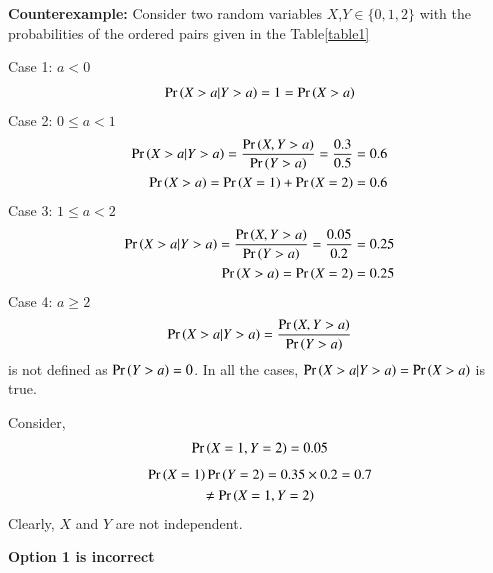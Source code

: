 \documentclass[journal,12pt,twocolumn]{IEEEtran}
\begin{document}
\begin{enumerate}
    \textbf{Counterexample:} Consider two random variables $X$,$Y \in \{0,1,2\}$ with the probabilities of the ordered pairs  given in the Table\ref{table1}
    \begin{center}
    \begin{table}[H]
    \begin{tiny}
    \centering
    \caption{}
    \label{table1}
    \end{tiny}
    \end{table}
    \end{center}
    Case 1: $a<0$
    \begin{align}
        \Pr\left(X>a|Y>a\right)=1=\Pr\left(X>a\right)
    \end{align}
    Case 2: $0\leq a <1$
    \begin{align}
        \Pr\left(X>a|Y>a\right)=\frac{\Pr\left(X,Y>a\right)}{\Pr\left(Y>a\right)}=\frac{0.3}{0.5}=0.6\\
        \Pr\left(X>a\right)=\Pr\left(X=1\right)+\Pr\left(X=2\right)=0.6
    \end{align}
    Case 3: $1\leq a <2$
    \begin{align}
        \Pr\left(X>a|Y>a\right)=\frac{\Pr\left(X,Y>a\right)}{\Pr\left(Y>a\right)}=\frac{0.05}{0.2}=0.25\\
        \Pr\left(X>a\right)=\Pr\left(X=2\right)=0.25
    \end{align}
    Case 4: $a\geq 2$
    \begin{align}
        \Pr\left(X>a|Y>a\right)=\frac{\Pr\left(X,Y>a\right)}{\Pr\left(Y>a\right)}
    \end{align}
    is not defined as $\Pr\left(Y>a\right)=0$.
    In all the cases, $\Pr\left(X>a|Y>a\right)=\Pr\left(X>a\right)$ is true.
    
    Consider,
    \begin{align}
        \Pr\left(X=1,Y=2\right)=0.05
    \end{align}
    \begin{multline}
        \Pr\left(X=1\right)\Pr\left(Y=2\right)=0.35\times0.2=0.7\\\neq\Pr\left(X=1,Y=2\right)
    \end{multline} 
    Clearly, $X$ and $Y$ are not independent. 
    
    \textbf{Option 1 is incorrect}
    

\end{enumerate}
\end{document}
